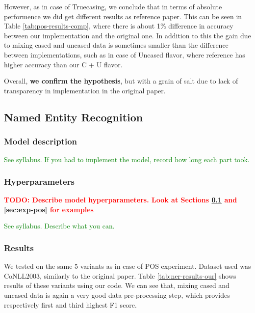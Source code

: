 \documentclass[11pt,a4paper]{article}
\begin{document}
    However, as in case of Truecasing, we conclude that in terms of absolute performence we did get different results as reference paper. This can be seen in Table \ref{tab:pos-results-comp}, where there is about 1\% difference in accuracy between our implementation and the original one. In addition to this the gain due to mixing cased and uncased data is sometimes smaller than the difference between implementations, such as in case of Uncased flavor, where reference has higher accuracy than our C + U flavor.

    Overall, \textbf{we confirm the hypothesis}, but with a grain of salt due to lack of transparency in implementation in the original paper.


\subsection{Named Entity Recognition}
\label{sec:exp-ner}

    \subsubsection{Model description}
    \textcolor{green}{See syllabus. If you had to implement the model, record how long each part took.}

    \subsubsection{Hyperparameters}
    \textbf{\textcolor{red}{TODO: Describe model hyperparameters. Look at Sections \ref{sec:exp-ner} and \ref{sec:exp-pos} for examples}}

    \textcolor{green}{See syllabus. Describe what you can.}

    \subsubsection{Results}
    We tested on the same 5 variants as in case of POS experiment. Dataset used was CoNLL2003, similarly to the original paper. Table \ref{tab:ner-results-our} shows results of these variants using our code. We can see that, mixing cased and uncased data is again a very good data pre-processing step, which provides respectively first and third highest F1 score.
\end{document}
